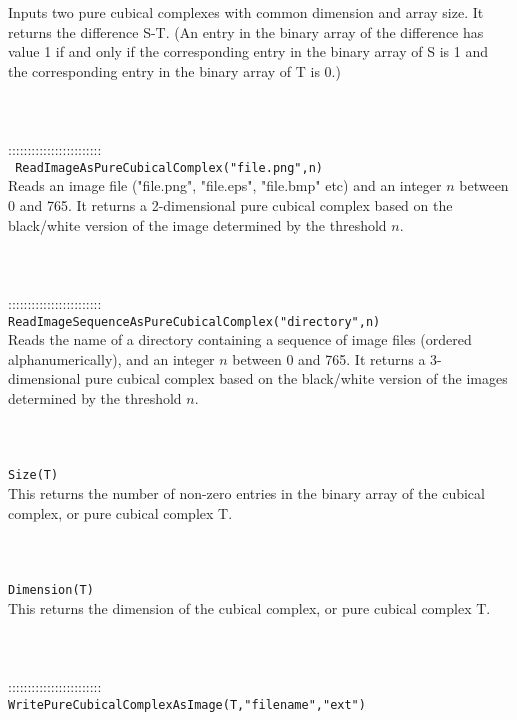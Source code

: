\documentclass[a4paper,11pt]{report}
\begin{document}
{ Inputs two pure cubical complexes with common dimension and array size. It
returns the difference S-T. (An entry in the binary array of the difference
has value 1 if and only if the corresponding entry in the binary array of S is
1 and the corresponding entry in the binary array of T is 0.) \\
 \\
 \\
 \\
 ::::::::::::::::::::::::\\
 \texttt{ ReadImageAsPureCubicalComplex("file.png",n)}\\
 

 Reads an image file ("file.png", "file.eps", "file.bmp" etc) and an integer $n$ between 0 and 765. It returns a 2-dimensional pure cubical complex based on
the black/white version of the image determined by the threshold $n$. \\
 \\
 \\
 \\
 ::::::::::::::::::::::::\\
 \texttt{ReadImageSequenceAsPureCubicalComplex("directory",n)}\\
 

 Reads the name of a directory containing a sequence of image files (ordered
alphanumerically), and an integer $n$ between 0 and 765. It returns a 3-dimensional pure cubical complex based on
the black/white version of the images determined by the threshold $n$. \\
 \\
 \\
 \\
 \texttt{Size(T)}\\
 

 This returns the number of non-zero entries in the binary array of the cubical
complex, or pure cubical complex T. \\
 \\
 \\
 \\
 \texttt{Dimension(T)}\\
 

 This returns the dimension of the cubical complex, or pure cubical complex T. \\
 \\
 \\
 \\
 ::::::::::::::::::::::::\\
 \texttt{WritePureCubicalComplexAsImage(T,"filename","ext")}\\
 

}
\end{document}
